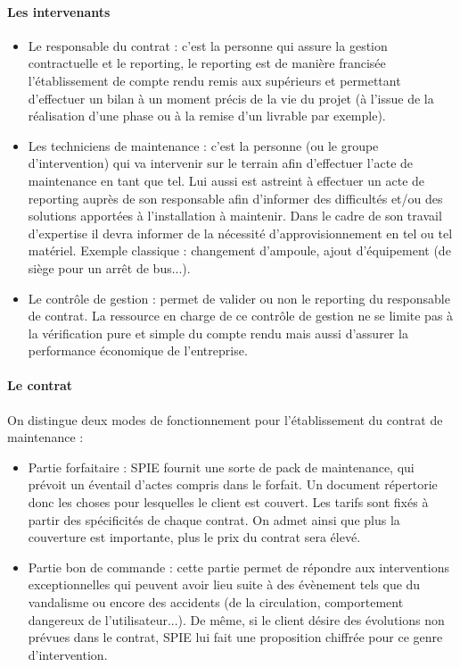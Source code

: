 

\paragraph{Les intervenants}

\begin{itemize}
\item Le responsable du contrat : c’est la personne qui assure la gestion contractuelle et le reporting, le reporting est de manière francisée l’établissement de compte rendu remis aux supérieurs et permettant d’effectuer un bilan à un moment précis de la vie du projet (à l’issue de la réalisation d’une phase ou à la remise d’un livrable par exemple).
\item Les techniciens de maintenance : c’est la personne (ou le groupe d’intervention) qui va intervenir sur le terrain afin d'effectuer l’acte de maintenance en tant que tel. Lui aussi est astreint à effectuer un acte de reporting auprès de son responsable afin d’informer des difficultés et/ou des solutions apportées à l’installation à maintenir. Dans le cadre de son travail d’expertise il devra informer de la nécessité d’approvisionnement en tel ou tel matériel. Exemple classique : changement d’ampoule, ajout d'équipement (de siège pour un arrêt de bus...).
\item Le contrôle de gestion : permet de valider ou non le reporting du responsable de contrat. La ressource en charge de ce contrôle de gestion ne se limite pas à la vérification pure et simple du compte rendu mais aussi d’assurer la performance économique de l’entreprise.
\end{itemize}

\paragraph{Le contrat}

On distingue deux modes de fonctionnement pour l’établissement du contrat de maintenance :

\begin{itemize}
\item Partie forfaitaire : SPIE fournit une sorte de pack de maintenance, qui prévoit un éventail d’actes compris dans le forfait. Un document répertorie donc les choses pour lesquelles le client est couvert. Les tarifs sont fixés à partir des spécificités de chaque contrat. On admet ainsi que plus la couverture est importante, plus le prix du contrat sera élevé. 
\item Partie bon de commande : cette partie permet de répondre aux interventions exceptionnelles qui peuvent avoir lieu suite à des évènement tels que du vandalisme ou encore des accidents (de la circulation, comportement dangereux de l’utilisateur...). De même, si le client désire des évolutions non prévues dans le contrat, SPIE lui fait une proposition chiffrée pour ce genre d’intervention.
\end{itemize}

